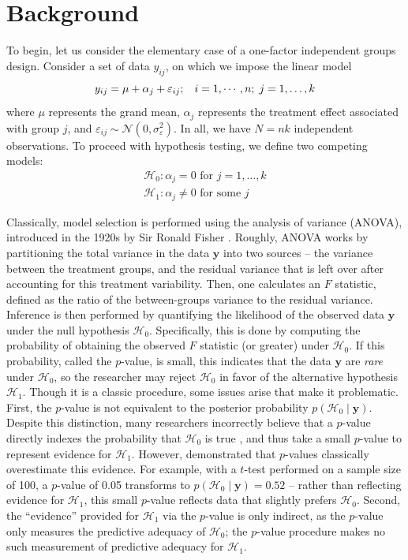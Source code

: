 \documentclass[12pt,twoside,a4paper]{article}
\begin{document}
\section{Background}
To begin, let us consider the elementary case of a one-factor independent groups design. Consider a set of data $y_{ij}$, on which we impose the linear model%
\[
  y_{ij}=\mu + \alpha_j + \varepsilon_{ij}; \hspace{3mm} i=1,\cdots,n; \hspace{1mm} j=1,\dots,k
\]%
where $\mu$ represents the grand mean, $\alpha_j$ represents the treatment effect associated with group $j$, and $\varepsilon_{ij} \sim \mathcal{N}(0,\sigma_{\varepsilon}^2)$. In all, we have $N=nk$ independent observations. To proceed with hypothesis testing, we define two competing models:%
\begin{gather*}
  \mathcal{H}_0:\alpha_j=0\text{ for }j=1,\dots,k\\
  \mathcal{H}_1:\alpha_j\neq 0\text{ for some }j
\end{gather*}

Classically, model selection is performed using the analysis of variance (ANOVA), introduced in the 1920s by Sir Ronald Fisher \citep{fisher1925}. Roughly, ANOVA works by partitioning the total variance in the data $\bm{y}$ into two sources -- the variance between the treatment groups, and the residual variance that is left over after accounting for this treatment variability. Then, one calculates an $F$ statistic, defined as the ratio of the between-groups variance to the residual variance. Inference is then performed by quantifying the likelihood of the observed data $\bm{y}$ under the null hypothesis $\mathcal{H}_0$. Specifically, this is done by computing the probability of obtaining the observed $F$ statistic (or greater) under $\mathcal{H}_0$. If this probability, called the $p$-value, is small, this indicates that the data $\bm{y}$ are {\it rare} under $\mathcal{H}_0$, so the researcher may reject $\mathcal{H}_0$ in favor of the alternative hypothesis $\mathcal{H}_1$. Though it is a classic procedure, some issues arise that make it problematic. First, the $p$-value is not equivalent to the posterior probability $p(\mathcal{H}_0\mid \bm{y})$. Despite this distinction, many researchers incorrectly believe that a $p$-value directly indexes the probability that $\mathcal{H}_0$ is true \citep{gigerenzer2004}, and thus take a small $p$-value to represent evidence for $\mathcal{H}_1$. However, \citet{berger1987} demonstrated that $p$-values classically overestimate this evidence. For example, with a $t$-test performed on a sample size of 100, a $p$-value of 0.05 transforms to $p(\mathcal{H}_0\mid \bm{y})=0.52$ -- rather than reflecting evidence for $\mathcal{H}_1$, this small $p$-value reflects data that slightly prefers $\mathcal{H}_0$. Second, the ``evidence'' provided for $\mathcal{H}_1$ via the $p$-value is only indirect, as the $p$-value only measures the predictive adequacy of $\mathcal{H}_0$; the $p$-value procedure makes no such measurement of predictive adequacy for $\mathcal{H}_1$.
\end{document}

